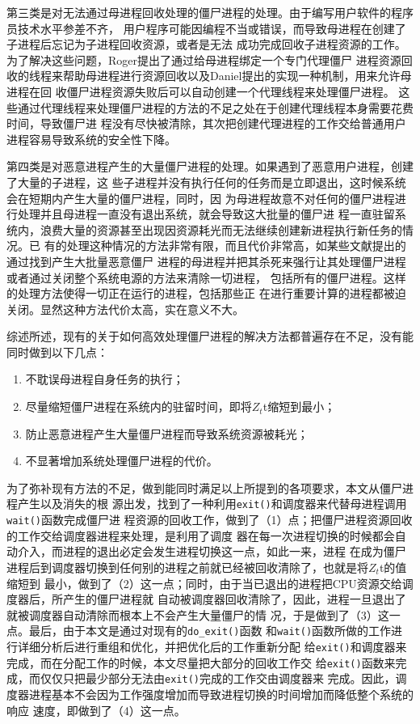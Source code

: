 \documentclass{swfuthesism}
\begin{document}
第三类是对无法通过母进程回收处理的僵尸进程的处理。由于编写用户软件的程序员技术水平参差不齐，
用户程序可能因编程不当或错误，而导致母进程在创建了子进程后忘记为子进程回收资源，或者是无法
成功完成回收子进程资源的工作。为了解决这些问题，Roger提出了通过给母进程绑定一个专门代理僵尸
进程资源回收的线程来帮助母进程进行资源回收以及Daniel提出的实现一种机制，用来允许母进程在回
收僵尸进程资源失败后可以自动创建一个代理线程来处理僵尸进程\cite{defunctproc1,defunctproc2}。
这些通过代理线程来处理僵尸进程的方法的不足之处在于创建代理线程本身需要花费时间，导致僵尸进
程没有尽快被清除，其次把创建代理进程的工作交给普通用户进程容易导致系统的安全性下降。

第四类是对恶意进程产生的大量僵尸进程的处理。如果遇到了恶意用户进程，创建了大量的子进程，这
些子进程并没有执行任何的任务而是立即退出，这时候系统会在短期内产生大量的僵尸进程，同时，因
为母进程故意不对任何的僵尸进程进行处理并且母进程一直没有退出系统，就会导致这大批量的僵尸进
程一直驻留系统内，浪费大量的资源甚至出现因资源耗光而无法继续创建新进程执行新任务的情况。已
有的处理这种情况的方法非常有限，而且代价非常高，如某些文献提出的通过找到产生大批量恶意僵尸
进程的母进程并把其杀死来强行让其处理僵尸进程或者通过关闭整个系统电源的方法来清除一切进程，
包括所有的僵尸进程\cite{wiki:zombieproc}。这样的处理方法使得一切正在运行的进程，包括那些正
在进行重要计算的进程都被迫关闭。显然这种方法代价太高，实在意义不大。

综述所述，现有的关于如何高效处理僵尸进程的解决方法都普遍存在不足，没有能同时做到以下几点：
\begin{enumerate}
\item 不耽误母进程自身任务的执行；
\item 尽量缩短僵尸进程在系统内的驻留时间，即将$Z_t$t缩短到最小；
\item 防止恶意进程产生大量僵尸进程而导致系统资源被耗光；
\item 不显著增加系统处理僵尸进程的代价。
\end{enumerate}

为了弥补现有方法的不足，做到能同时满足以上所提到的各项要求，本文从僵尸进程产生以及消失的根
源出发，找到了一种利用\texttt{exit()}和调度器来代替母进程调用\texttt{wait()}函数完成僵尸进
程资源的回收工作，做到了（1）点；把僵尸进程资源回收的工作交给调度器进程来处理，是利用了调度
器在每一次进程切换的时候都会自动介入，而进程的退出必定会发生进程切换这一点，如此一来，进程
在成为僵尸进程后到调度器切换到任何别的进程之前就已经被回收清除了，也就是将$Z_t$t的值缩短到
最小，做到了（2）这一点；同时，由于当已退出的进程把CPU资源交给调度器后，所产生的僵尸进程就
自动被调度器回收清除了，因此，进程一旦退出了就被调度器自动清除而根本上不会产生大量僵尸的情
况，于是做到了（3）这一点。最后，由于本文是通过对现有的\texttt{do\_exit()}函数
和\texttt{wait()}函数所做的工作进行详细分析后进行重组和优化，并把优化后的工作重新分配
给\texttt{exit()}和调度器来完成，而在分配工作的时候，本文尽量把大部分的回收工作交
给\texttt{exit()}函数来完成，而仅仅只把最少部分无法由\texttt{exit()}完成的工作交由调度器来
完成。因此，调度器进程基本不会因为工作强度增加而导致进程切换的时间增加而降低整个系统的响应
速度，即做到了（4）这一点。
\end{document}
